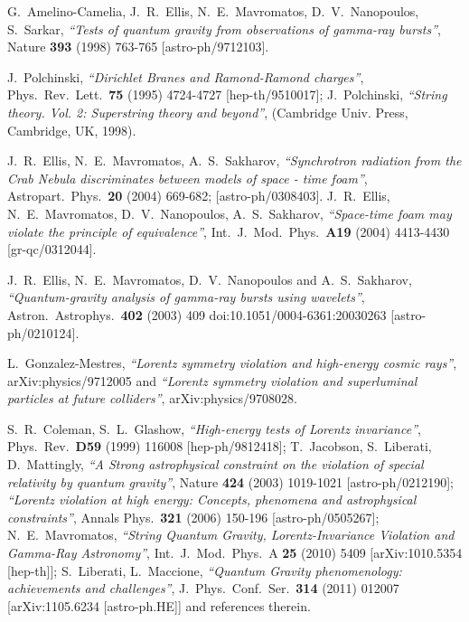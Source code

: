 \documentclass[12pt]{article}
\begin{document}
{\begin{thebibliography}{99}
  G.~Amelino-Camelia, J.~R.~Ellis, N.~E.~Mavromatos, D.~V.~Nanopoulos, S.~Sarkar,
  {\it ``Tests of quantum gravity from observations of gamma-ray bursts''},
  Nature {\bf 393 } (1998)  763-765
  [astro-ph/9712103].

  J.~Polchinski,
  {\it ``Dirichlet Branes and Ramond-Ramond charges''},
  Phys.\ Rev.\ Lett.\  {\bf 75 } (1995)  4724-4727
  [hep-th/9510017]; J.~Polchinski,
  {\it ``String theory. Vol. 2: Superstring theory and beyond''},
  (Cambridge Univ. Press, Cambridge, UK, 1998).

   J.~R.~Ellis, N.~E.~Mavromatos, A.~S.~Sakharov,
  {\it ``Synchrotron radiation from the Crab Nebula discriminates between models of space - time foam''},
  Astropart.\ Phys.\  {\bf 20 } (2004)  669-682;
  [astro-ph/0308403].
  J.~R.~Ellis, N.~E.~Mavromatos, D.~V.~Nanopoulos, A.~S.~Sakharov,
  {\it ``Space-time foam may violate the principle of equivalence''},
  Int.\ J.\ Mod.\ Phys.\  {\bf A19 } (2004)  4413-4430
  [gr-qc/0312044].

  J.~R.~Ellis, N.~E.~Mavromatos, D.~V.~Nanopoulos and A.~S.~Sakharov,
  {\it ``Quantum-gravity analysis of gamma-ray bursts using wavelets''},
  Astron.\ Astrophys.\  {\bf 402} (2003) 409
  doi:10.1051/0004-6361:20030263
  [astro-ph/0210124].

   L.~Gonzalez-Mestres,
  {\it ``Lorentz symmetry violation and high-energy cosmic rays''},
  arXiv:physics/9712005 and
  {\it ``Lorentz symmetry violation and superluminal particles at future colliders''},
    arXiv:physics/9708028.

 S.~R.~Coleman, S.~L.~Glashow,
  {\it ``High-energy tests of Lorentz invariance''},
  Phys.\ Rev.\  {\bf D59 } (1999)  116008
  [hep-ph/9812418];
  T.~Jacobson, S.~Liberati, D.~Mattingly,
  {\it ``A Strong astrophysical constraint on the violation of special relativity by quantum gravity''},
  Nature {\bf 424 } (2003)  1019-1021
  [astro-ph/0212190];
  {\it ``Lorentz violation at high energy: Concepts, phenomena and astrophysical constraints''},
  Annals Phys.\  {\bf 321 } (2006)  150-196
  [astro-ph/0505267];
  N.~E.~Mavromatos,
  {\it ``String Quantum Gravity, Lorentz-Invariance Violation and Gamma-Ray Astronomy''},
  Int.\ J.\ Mod.\ Phys.\  A {\bf 25} (2010) 5409
  [arXiv:1010.5354 [hep-th]];
  S.~Liberati, L.~Maccione,
  {\it ``Quantum Gravity phenomenology: achievements and challenges''},
  J.\ Phys.\ Conf.\ Ser.\  {\bf 314 } (2011)  012007
  [arXiv:1105.6234 [astro-ph.HE]] and references therein.


\end{thebibliography}}
\end{document}
